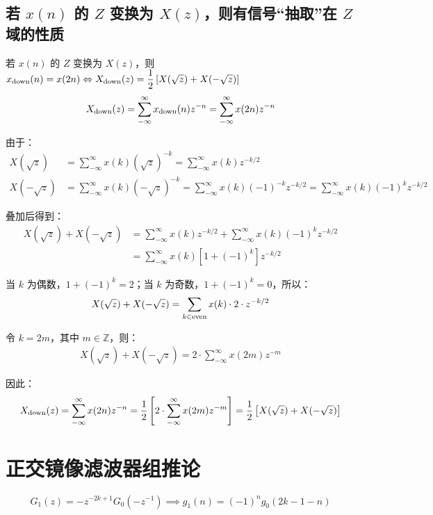 \documentclass{article}
\begin{document}
\subsection{若 $x(n)$ 的 $Z$ 变换为 $X(z)$，则有信号“抽取”在 $Z$ 域的性质}
若 $x(n)$ 的 $Z$ 变换为 $X(z)$，则 $x_{\rm down}(n)=x(2n)\Leftrightarrow X_{\rm down}(z)=\dfrac{1}{2}\left[X(\sqrt{z})+X(-\sqrt{z})\right]$
\begin{align*}
    X_{\rm down}(z)=\sum_{-\infty}^{\infty}x_{\rm down}(n)z^{-n}=\sum_{-\infty}^{\infty}x(2n)z^{-n}
\end{align*}

由于：
\begin{align*}
    X(\sqrt{z})&=\sum_{-\infty}^{\infty}x(k)(\sqrt{z})^{-k}=\sum_{-\infty}^{\infty}x(k)z^{-k/2}
    \\
    X(-\sqrt{z})&=\sum_{-\infty}^{\infty}x(k)(-\sqrt{z})^{-k}=\sum_{-\infty}^{\infty}x(k)(-1)^{-k}z^{-k/2}=\sum_{-\infty}^{\infty}x(k)(-1)^{k}z^{-k/2}
\end{align*}

叠加后得到：
\begin{align*}
    X(\sqrt{z})+X(-\sqrt{z})&=\sum_{-\infty}^{\infty}x(k)z^{-k/2}+\sum_{-\infty}^{\infty}x(k)(-1)^{k}z^{-k/2}
    \\
    &=\sum_{-\infty}^{\infty}x(k)\left[1+(-1)^k\right]z^{-k/2}
\end{align*}

当 $k$ 为偶数，$1+(-1)^k=2$；当 $k$ 为奇数，$1+(-1)^k=0$，所以：
\begin{align*}
    X(\sqrt{z})+X(-\sqrt{z})=\sum_{k\in\rm even}x(k)\cdot2\cdot z^{-k/2}
\end{align*}

令 $k=2m$，其中 $m\in\mathbb{Z}$，则：
\begin{align*}
    X(\sqrt{z})+X(-\sqrt{z})=2\cdot\sum_{-\infty}^{\infty}x(2m)z^{-m}
\end{align*}

因此：
\begin{align*}
    X_{\rm down}(z)=\sum_{-\infty}^{\infty}x(2n)z^{-n}=\dfrac{1}{2}\left[2\cdot\sum_{-\infty}^{\infty}x(2m)z^{-m}\right]=\dfrac{1}{2}\left[X(\sqrt{z})+X(-\sqrt{z})\right]
\end{align*}



\section{正交镜像滤波器组推论}
\[ G_1(z)=-z^{-2k+1}G_0(-z^{-1})\implies g_1(n)=(-1)^ng_0(2k-1-n) \]
\end{document}
